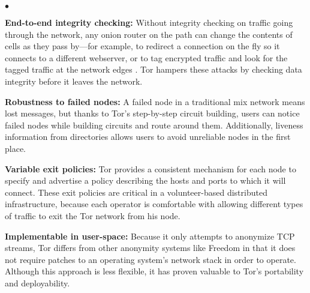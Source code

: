 \documentclass[times,10pt,twocolumn]{article}
\newenvironment{tightlist}{\begin{list}{$\bullet$}{
  \setlength{\itemsep}{0mm}
    \setlength{\parsep}{0mm}
    }}{\end{list}}
\begin{document}
\begin{tightlist}
\item \textbf{End-to-end integrity checking:} Without integrity checking
on traffic going through the network, any onion router on the path
can change the contents of cells as they pass by---for example, to redirect a
connection on the fly so it connects to a different webserver, or to
tag encrypted traffic and look for the tagged traffic at the network
edges \cite{minion-design}.  Tor hampers these attacks by checking data
integrity before it leaves the network.

\item \textbf{Robustness to failed nodes:} A failed node in a traditional
mix network means lost messages, but thanks to Tor's step-by-step
circuit building, users can notice failed
nodes while building circuits and route around them.  Additionally,
liveness information from directories allows users to avoid
unreliable nodes in the first place.
%

\item \textbf{Variable exit policies:} Tor provides a consistent
mechanism for
each node to specify and advertise a policy describing the hosts and
ports to which it will connect. These exit policies
are critical in a volunteer-based distributed infrastructure, because
each operator is comfortable with allowing different types of traffic
to exit the Tor network from his node.

\item \textbf{Implementable in user-space:} Because it only attempts to
anonymize TCP streams, Tor differs from other anonymity systems like
Freedom \cite{freedom} in that it does not require patches to an operating
system's network stack in order to operate.  Although this approach is less
flexible, it has proven valuable to Tor's portability and deployability.


\end{tightlist}
\end{document}
